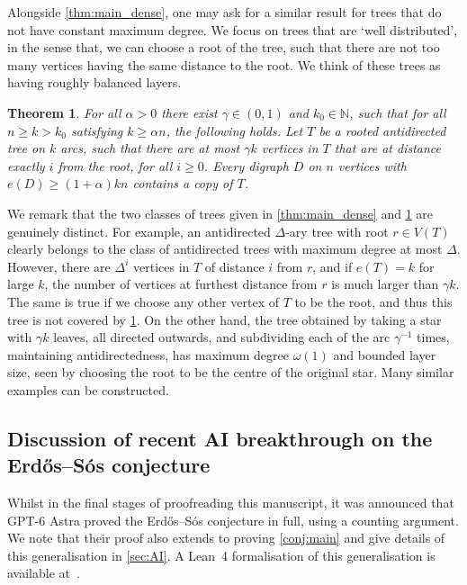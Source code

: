 \documentclass[11pt]{article}
\newtheorem{theorem}{Theorem}[section]
\numberwithin{equation}{section}
\renewcommand{\geq}{\geqslant}
\def\NN{\mathbb N}
\theoremstyle{definition}
\begin{document}
Alongside \cref{thm:main_dense}, one may ask for a similar result for trees that do not have constant maximum degree. We focus on trees that are `well distributed', in the sense that, we can choose a root of the tree, such that there are not too many vertices having the same distance to the root. We think of these trees as having roughly balanced layers.

\begin{theorem}\label{thm:balance_trees}
    For all $\alpha>0$ there exist $\gamma \in (0,1)$ and $k_0\in \NN$, such that for all $n\geq k> k_0$ satisfying $k\geq \alpha n$, the following holds.  Let $T$ be a rooted antidirected tree on $k$ arcs, such that there are at most $\gamma k$ vertices in $T$ that are at distance exactly $i$ from the root, for all $i\geq 0$.
    Every digraph  $D$ on $n$ vertices with $e(D)\geq (1+\alpha)kn$ contains a copy of $T$.
\end{theorem}

We remark that the two classes of trees given in \cref{thm:main_dense} and \cref{thm:balance_trees} are genuinely distinct. For example, an antidirected $\Delta$-ary tree with root $r\in V(T)$ clearly belongs to the class of antidirected trees with maximum degree at most $\Delta$. However, there are $\Delta^i$ vertices in $T$ of distance $i$ from $r$, and if $e(T) = k$ for large $k$, the number of vertices at furthest distance from $r$ is much larger than $\gamma k$. The same is true if we choose any other vertex of $T$ to be the root, and thus this tree is not covered by \cref{thm:balance_trees}. On the other hand, the tree obtained by taking a star with $\gamma k$ leaves, all directed outwards, and subdividing each of the arc $\gamma^{-1}$ times, maintaining antidirectedness, has maximum degree $\omega(1)$ and bounded layer size, seen by choosing the root to be the centre of the original star. Many similar examples can be constructed.

\subsection{Discussion of recent AI breakthrough on the Erd\H{o}s--S\'{o}s conjecture}
Whilst in the final stages of proofreading this manuscript, it was announced that GPT-6 Astra proved the Erd\H{o}s--S\'{o}s conjecture in full, using a counting argument.
We note that their proof also extends to proving \cref{conj:main} and give details of this generalisation in \cref{sec:AI}.
A Lean~4 formalisation of this generalisation is available at~\cite{DLean}.
\end{document}
